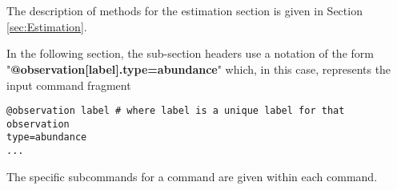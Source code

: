 \subsection{}


\ifAgeBased
\subsection{}

\subsection{}

\else
\subsection{}

\fi 

\subsection{}


\subsection{}


\subsection{}


 \pagebreak 
 \section{\label{syntax:Estimation}}

The description of methods for the estimation section is given in Section \ref{sec:Estimation}.

In the following section, the sub-section headers use a notation of the form "\textbf {@observation[label].type=abundance}" which, in this case, represents the input command fragment
{\small{\begin{verbatim}
@observation label # where label is a unique label for that observation
type=abundance
...
\end{verbatim}}}
The specific subcommands for a command are given within each command.

